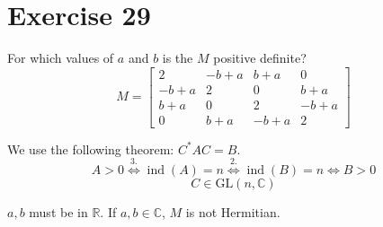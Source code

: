 \documentclass[a4paper]{article}
\theoremstyle{definition}
\begin{document}
\section{Exercise 29}
\begin{ex}
  For which values of $a$ and $b$ is the $M$ positive definite?
  \[
    M = \begin{bmatrix}
      2 & -b + a & b + a & 0 \\
      -b + a & 2 & 0 & b + a \\
      b + a & 0 & 2 & -b + a \\
      0 & b + a & -b + a & 2
    \end{bmatrix}
  \]
\end{ex}

We use the following theorem: $C^* A C = B$.
\[ A > 0 \overset{3.}{\Leftrightarrow} \operatorname{ind}(A) = n \overset{2.}{\Leftrightarrow} \operatorname{ind}(B) = n \Leftrightarrow B > 0 \]
\[ C \in \textrm{GL}(n, \mathbb C) \]

$a, b$ must be in $\mathbb R$. If $a,b \in \mathbb C$, $M$ is not Hermitian.
\end{document}
